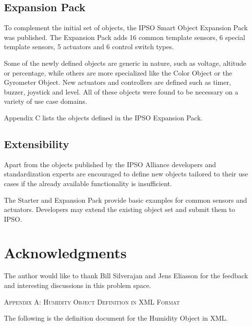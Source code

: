 \documentclass[peerreview, a4paper, 7pt]{IEEEtran}
\begin{document}
\subsection{Expansion Pack}

To complement the initial set of objects, the IPSO Smart Object Expansion Pack was published. The Expansion Pack adds 16 common template sensors, 6 special template sensors, 5 actuators and 6 control switch types.  

Some of the newly defined objects are generic in nature, such as voltage, altitude or percentage, while others are more specialized like the Color Object or the Gyrometer Object. New actuators and controllers are defined such as timer, buzzer, joystick and level. All of these objects were found to be necessary on a variety of use case domains.

Appendix C lists the objects defined in the IPSO Expansion Pack. 

\subsection{Extensibility}

Apart from the objects published by the IPSO Alliance developers and standardization experts are encouraged to define new objects tailored to their use cases if the already available functionality is insufficient. %

The Starter and Expansion Pack provide basic examples for common sensors and actuators. Developers may extend the existing object set and submit them to IPSO. %

\section{Acknowledgments}
The author would like to thank Bill Silverajan and Jens Eliasson for the feedback and interesting discussions in this problem space.




% 



\appendix
\label{appendix_a}

\textsc{Appendix A: Humidity Object Definition in XML Format}

The following is the definition document for the Humidity Object in XML.
\end{document}
